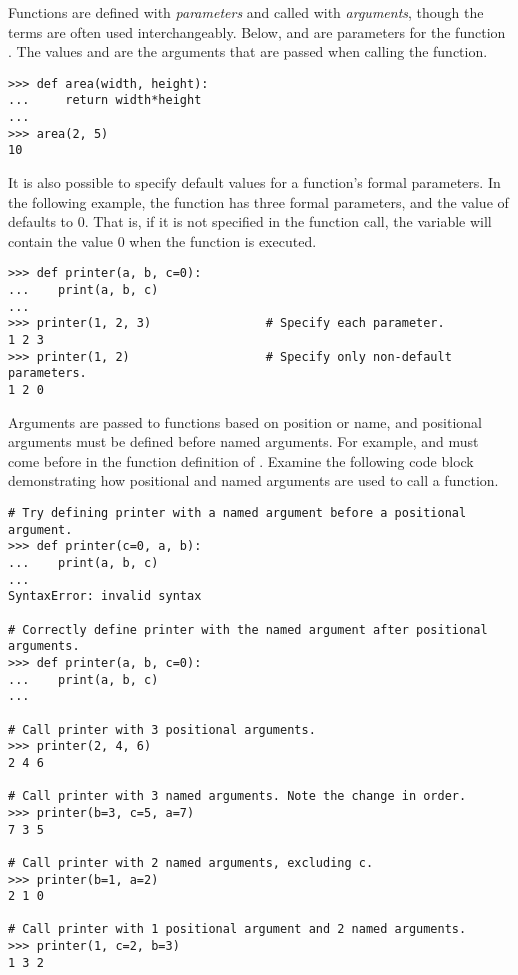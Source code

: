 Functions are defined with \emph{parameters} and called with \emph{arguments}, though the terms are often used interchangeably.
Below,  and  are parameters for the function .
The values  and  are the arguments that are passed when calling the function.

\begin{lstlisting}
>>> def area(width, height):
...     return width*height
...         
>>> area(2, 5)
10
\end{lstlisting}

It is also possible to specify default values for a function's formal parameters.
In the following example, the function  has three formal parameters, and the value of  defaults to 0.
That is, if it is not specified in the function call, the variable  will contain the value 0 when the function is executed.

\begin{lstlisting}
>>> def printer(a, b, c=0):
...    print(a, b, c)
...
>>> printer(1, 2, 3)                # Specify each parameter.
1 2 3
>>> printer(1, 2)                   # Specify only non-default parameters.
1 2 0
\end{lstlisting} %

Arguments are passed to functions based on position or name, and positional arguments must be defined before named arguments.
For example,  and  must come before  in the function definition of .
Examine the following code block demonstrating how positional and named arguments are used to call a function.
\begin{lstlisting}
# Try defining printer with a named argument before a positional argument.
>>> def printer(c=0, a, b):
...    print(a, b, c)
...
SyntaxError: invalid syntax

# Correctly define printer with the named argument after positional arguments.
>>> def printer(a, b, c=0):
...    print(a, b, c)
...

# Call printer with 3 positional arguments.
>>> printer(2, 4, 6)
2 4 6

# Call printer with 3 named arguments. Note the change in order.
>>> printer(b=3, c=5, a=7)
7 3 5

# Call printer with 2 named arguments, excluding c.
>>> printer(b=1, a=2)
2 1 0

# Call printer with 1 positional argument and 2 named arguments.
>>> printer(1, c=2, b=3)
1 3 2
\end{lstlisting}


